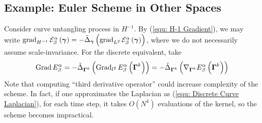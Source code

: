 \documentclass[../dissertation.tex]{subfiles}
\begin{document}
\subsection{Example: Euler Scheme in Other Spaces}
Consider curve untangling process in $H^{-1}$.
By (\ref{equ: H-1 Gradient}), we may write $\operatorname{grad}_{H^{-1}} \mathcal{E}_{\beta}^{\alpha} \left( \boldsymbol{\gamma} \right) = - \tilde{\Delta}_{\boldsymbol{\gamma}} \left( \operatorname{grad}_{L^2} \mathcal{E}_{\beta}^{\alpha} \left( \boldsymbol{\gamma} \right)\right)$,
where we do not necessarily assume scale-invariance.
For the discrete equivalent, take
\begin{equation}
    \operatorname{Grad} E_{\beta}^{\alpha} = - \tilde{\Delta}_{\boldsymbol{\Gamma}^k} \left( \operatorname{Grad}_{l^2} E_{\beta}^{\alpha} \left( \boldsymbol{\Gamma}^k \right) \right) = - \tilde{\Delta}_{\boldsymbol{\Gamma}^k} \left( \nabla_{\boldsymbol{\Gamma}^k} E_{\beta}^{\alpha} \left( \boldsymbol{\Gamma}^k \right) \right)
\end{equation}
Note that computing ``third derivative operator'' %
could increase complexity of the scheme.
In fact, if one approximates the Laplacian as (\ref{equ: Discrete Curve Laplacian}), 
for each time step, it takes $O \left( N^4 \right)$ evaluations of the kernel, so the scheme becomes impractical.
\end{document}
